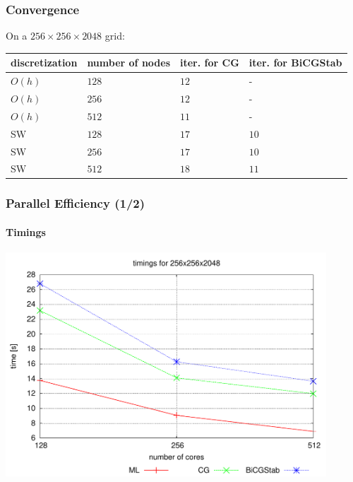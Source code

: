 \documentclass[xcolor=pdftex,table,10pt]{beamer}
\begin{document}
	
	\begin{frame}
		\frametitle{Convergence}

		On a $256 \times 256 \times 2048$ grid:
		\begin{center}
		\begin{tabular}{|l|l|l|l|}
			\hline
			discretization & number of nodes & iter. for CG & iter. for BiCGStab\\
			\hline
			$O(h)$ & $128$ & $12$ & - \\
			$O(h)$ & $256$ & $12$ & - \\
			$O(h)$ & $512$ & $11$ & - \\
			\hline
			SW & $128$ & $17$ & $10$ \\
			SW & $256$ & $17$ & $10$ \\
			SW & $512$ & $18$ & $11$ \\
			\hline
		\end{tabular}
		\end{center}

	\end{frame}
	
	\begin{frame}
		\frametitle{Parallel Efficiency (1/2)}
		\framesubtitle{Timings}

		\begin{center}
		\includegraphics[width=0.9\textwidth]{plots/timings_SW.pdf}
		\end{center}

	\end{frame}
	
\end{document}
